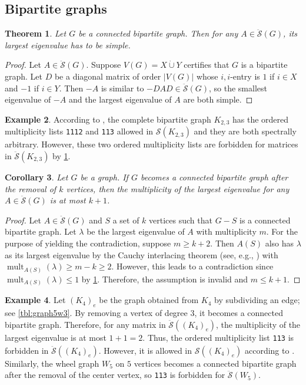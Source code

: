 \documentclass{article}
\newtheorem{theorem}{Theorem}[section]
\newtheorem{corollary}[theorem]{Corollary}
\theoremstyle{definition}
\newtheorem{example}[theorem]{Example}
\newcommand{\dunion}{\mathbin{\dot\cup}}
\newcommand{\mptn}{\mathcal{S}}
\newcommand{\mdso}{\ddot{\mathcal{S}}}
\newcommand{\mtt}[2][]{\texttt{#2}\textsubscript{#1}}
\newcommand{\mult}{\operatorname{mult}}
\begin{document}
\subsection{Bipartite graphs}

\begin{theorem}
\label{thm:bip}
Let $G$ be a connected bipartite graph.  Then for any $A\in\mdso(G)$, its largest eigenvalue has to be simple.
\end{theorem}
\begin{proof}
Let $A\in\mdso(G)$.  Suppose $V(G) = X\dunion Y$ certifies that $G$ is a bipartite graph.  Let $D$ be a diagonal matrix of order $|V(G)|$ whose $i,i$-entry is $1$ if $i\in X$ and $-1$ if $i\in Y$.  Then $-A$ is similar to $-DAD\in\mdso(G)$, so the smallest eigenvalue of $-A$ and the largest eigenvalue of $A$ are both simple.  
\end{proof}

\begin{example}
\label{ex:k23bip}
According to \cite{IEPG2}, the complete bipartite graph $K_{2,3}$ has the ordered multiplicity lists \mtt{1112} and \mtt{113} allowed in $\mptn(K_{2,3})$ and they are both spectrally arbitrary.  However, these two ordered multiplicity lists are forbidden for matrices in $\mdso(K_{2,3})$ by \cref{thm:bip}. 
\end{example}

\begin{corollary}
\label{cor:bipv}
Let $G$ be a graph.  If $G$ becomes a connected bipartite graph after the removal of $k$ vertices, then the multiplicity of the largest eigenvalue for any $A\in\mdso(G)$ is at most $k + 1$.  
\end{corollary}
\begin{proof}
Let $A\in\mdso(G)$ and $S$ a set of $k$ vertices such that $G - S$ is a connected bipartite graph.  Let $\lambda$ be the largest eigenvalue of $A$ with multiplicity $m$.  For the purpose of yielding the contradiction, suppose $m \geq k + 2$.  Then $A(S)$ also has $\lambda$ as its largest eigenvalue by the Cauchy interlacing theorem (see, e.g., \cite{BHSoG12}) with $\mult_{A(S)}(\lambda) \geq m - k \geq 2$.  However, this leads to a contradiction since $\mult_{A(S)}(\lambda) \leq 1$ by \cref{thm:bip}.  Therefore, the assumption is invalid and $m \leq k + 1$.
\end{proof}

\begin{example}
\label{ex:k4se}
Let $(K_4)_e$ be the graph obtained from $K_4$ by subdividing an edge; see \cref{tbl:graph5w3}.  By removing a vertex of degree $3$, it becomes a connected bipartite graph.  Therefore, for any matrix in $\mdso((K_4)_e)$, the multiplicity of the largest eigenvalue is at most $1 + 1 = 2$.  Thus, the ordered multiplicity list \mtt{113} is forbidden in $\mdso((K_4)_e)$.  However, it is allowed in $\mptn((K_4)_e)$ according to \cite{IEPG2}.  Similarly, the wheel graph $W_5$ on $5$ vertices becomes a connected bipartite graph after the removal of the center vertex, so \mtt{113} is forbidden for $\mdso(W_5)$.  
\end{example}
\end{document}
